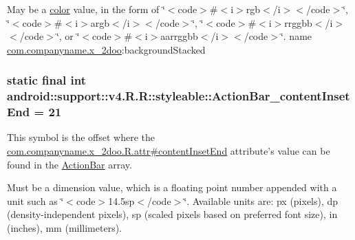 May be a \hyperlink{classandroid_1_1support_1_1v4_1_1_r_1_1color}{color} value, in the form of \char`\"{}$<$code$>$\#$<$i$>$rgb$<$/i$>$$<$/code$>$\char`\"{}, \char`\"{}$<$code$>$\#$<$i$>$argb$<$/i$>$$<$/code$>$\char`\"{}, \char`\"{}$<$code$>$\#$<$i$>$rrggbb$<$/i$>$$<$/code$>$\char`\"{}, or \char`\"{}$<$code$>$\#$<$i$>$aarrggbb$<$/i$>$$<$/code$>$\char`\"{}.  name \hyperlink{namespacecom_1_1companyname_1_1x__2doo}{com.companyname.x\_\-2doo}:backgroundStacked \hypertarget{classandroid_1_1support_1_1v4_1_1_r_1_1styleable_2fc65202296211aca68d2f909690758f}{
\subsubsection[{ActionBar\_\-contentInsetEnd}]{\setlength{\rightskip}{0pt plus 5cm}static final int android::support::v4.R.R::styleable::ActionBar\_\-contentInsetEnd = 21}}
\label{classandroid_1_1support_1_1v4_1_1_r_1_1styleable_2fc65202296211aca68d2f909690758f}


This symbol is the offset where the \hyperlink{classcom_1_1companyname_1_1x__2doo_1_1_r_1_1attr_58c86668d5cc32508a8afdee1e07a9d8}{com.companyname.x\_\-2doo.R.attr\#contentInsetEnd} attribute's value can be found in the \hyperlink{classandroid_1_1support_1_1v4_1_1_r_1_1styleable_5c6cf2c83551ebae05f365bb913fdddf}{ActionBar} array.

Must be a dimension value, which is a floating point number appended with a unit such as \char`\"{}$<$code$>$14.5sp$<$/code$>$\char`\"{}. Available units are: px (pixels), dp (density-independent pixels), sp (scaled pixels based on preferred font size), in (inches), mm (millimeters). 

